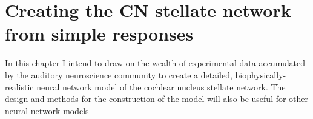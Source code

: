 \documentclass[11pt,a4paper,twoside]{book} %
\begin{document}


\chapter[Simple Responses]{Creating the CN stellate network from simple responses}
\label{sec:SimpleResponsesChapter}
In this chapter I intend to draw on the wealth of experimental data
accumulated by the auditory neuroscience community to create a
detailed, biophysically-realistic neural network model of the cochlear
nucleus stellate network.  The design and methods for the construction
of the model will also be useful for other neural network models 


\newpage

\newpage

\newpage







\end{document}
